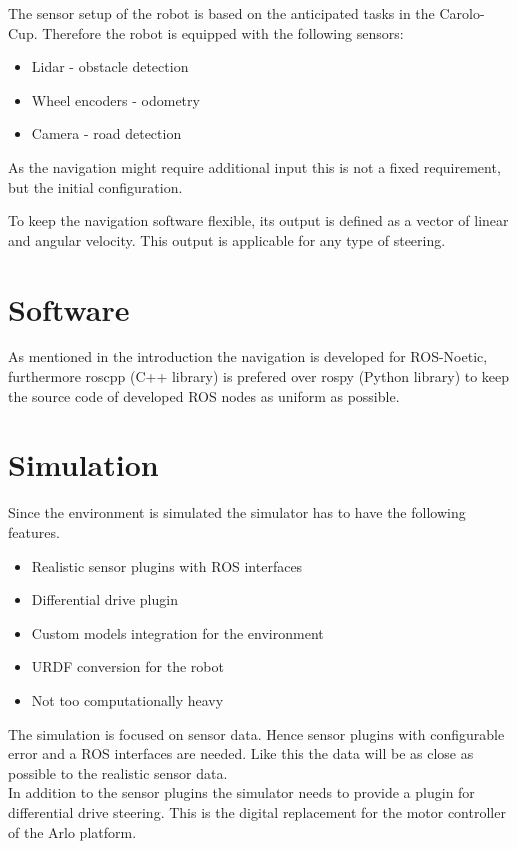The sensor setup of the robot is based on the anticipated tasks in the Carolo-Cup. 
Therefore the robot is equipped with the following sensors:

\begin{itemize}
	\item Lidar - obstacle detection
	\item Wheel encoders - odometry
	\item Camera - road detection
\end{itemize}

As the navigation might require additional input this is not a fixed requirement, but the initial configuration.

To keep the navigation software flexible, its output is defined as a vector of linear and angular velocity. This output is applicable for any type of steering.

\section{Software}
As mentioned in the introduction the navigation is developed for ROS-Noetic, furthermore roscpp (C++ library) is prefered over rospy (Python library) to keep the source code of developed ROS nodes as uniform as possible.

\section{Simulation}
Since the environment is simulated the simulator has to have the following features.
\begin{itemize}
	\item Realistic sensor plugins with ROS interfaces
	\item Differential drive plugin
	\item Custom models integration for the environment
	\item URDF conversion for the robot
	\item Not too computationally heavy
\end{itemize}

The simulation is focused on sensor data. Hence sensor plugins with configurable error and a ROS interfaces are needed. Like this the data will be as close as possible to the realistic sensor data.\\

In addition to the sensor plugins the simulator needs to provide a plugin for differential drive steering. This is the digital replacement for the motor controller of the Arlo platform.\\

